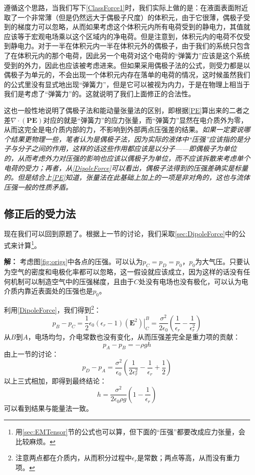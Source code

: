 \documentclass{ctexart}
\newcommand{\epsz}{\epsilon_0}
\newcommand{\epsr}{\epsilon_r}
\begin{document}
	遵循这个思路，当我们写下\eqref{ClassForce1}时，我们实际上做的是：在液面表面附近取了一个非常薄（但是仍然远大于偶极子尺度）的体积元，由于它很薄，偶极子受到的梯度力可以忽略，从而如果考虑这个体积元内所有电荷受到的静电力，其值就应该等于宏观电场乘以这个区域内的净电荷。但是注意到，体积元内的电荷不仅受到静电力。对于一半在体积元内一半在体积元外的偶极子，由于我们的系统只包含了在体积元内的那个电荷，因此另一个电荷对这个电荷的“弹簧力”应该是这个系统受到的外力，因此也应该被考虑进来。但如果采用偶极子法的公式，则受力都是以偶极子为单元的，不会出现一个体积元内存在落单的电荷的情况，这时候虽然我们的公式里没有显式地出现“弹簧力”，但是它可以被视为内力，于是在物理上相当于我们是考虑了“弹簧力”的。这就说明了我们上面修正的合法性。
	
	这也一般性地说明了偶极子法和能动量张量法的区别，即根据\eqref{PE}算出来的二者之差$\nabla\cdot(\mathbf P\mathbf E)$对应的就是“弹簧力”的应力张量，而“弹簧力”显然在电介质外为零，从而这完全是电介质内部的力，不影响到外部两点压强差的结果。{\itshape 如果一定要说哪个结果更物理一些，笔者认为是偶极子法，因为实际的液体中“压强”应该指的是分子与分子之间的作用，这样的话这些作用都应该是以分子——即偶极子为单位的，从而考虑外力对压强的影响也应该以偶极子为单位，而不应该拆散来考虑单个电荷的受力；再者，从\eqref{DipoleForce}可以看出，偶极子法得到的压强差确实是标量的。但是结合上\eqref{PE}知道，张量法在此基础上加上的一项是非对角的，这也与流体压强一般的性质矛盾。}
	
	\subsection{修正后的受力法}
	
	现在我们可以回到原题了。根据上一节的讨论，我们采取\ref{sec:DipoleForce}中的公式来计算\footnote{用\ref{sec:EMTensor}节的公式也可以算，但下面的“压强”都要改成应力张量，会比较麻烦。}。
	
	\textbf{解：} 考虑图\ref{fig:origs}中各点的压强。可以认为$p_C=p_D=p_0$，$p_0$为大气压。只要认为空气的密度和电极化率都可以忽略，这一假设就应该成立，因为这样的话没有任何机制可以制造空气中的压强梯度，且由于$C$处没有电场也没有极化，可以认为电介质内靠近表面处的压强也是$p_0$。
	
	利用\eqref{DipoleForce}，我们得到\footnote{注意两点都在介质内，从而积分过程中$\epsr$是常数；两点等高，从而没有重力项。}：
	\begin{equation}
	p_B-p_C=\frac{1}{2}\epsz(\epsr-1)\left.\left(\mathbf E^2\right)\right|_C^B=\frac{\sigma^2}{2\epsz}\left(\frac{1}{\epsr}-\frac{1}{\epsr^2}\right)
	\end{equation}
	从$B$到$A$，电场均匀，介电常数也没有变化，从而压强差完全是重力项的贡献：
	\begin{equation}
	p_A-p_B=-\rho gh
	\end{equation}
	由上一节的讨论：
	\begin{equation}
	p_D-p_A=\frac{\sigma^2}{\epsz}\left(\frac{1}{2\epsr^2}-\frac{1}{\epsr}+\frac{1}{2}\right)
	\end{equation}
	以上三式相加，即得到最终结论：
	\begin{equation}
	h=\frac{\sigma^2}{2\epsz\rho g}\left(1-\frac{1}{\epsr}\right)
	\end{equation}
	可以看到结果与能量法一致。
	
\end{document}
